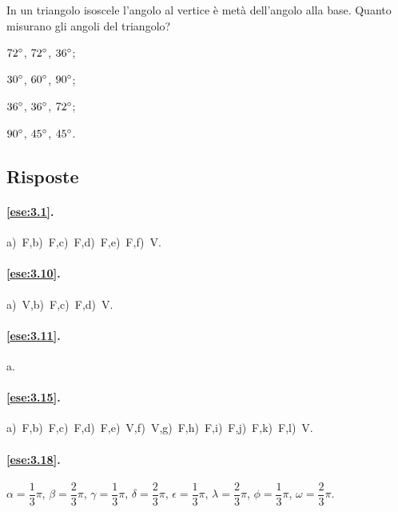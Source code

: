 \pagebreak

\begin{esercizio}
\label{ese:3.117}
In un triangolo isoscele l'angolo al vertice è metà dell'angolo alla base. Quanto misurano gli angoli del triangolo?
\begin{multicols}{4}
\begin{enumeratea}
\item $72{}^{\circ}$, $72{}^{\circ}$, $36{}^{\circ}$;
\item $30{}^{\circ}$, $60{}^{\circ}$, $90{}^{\circ}$;
\item $36{}^{\circ}$, $36{}^{\circ}$, $72{}^{\circ}$;
\item $90{}^{\circ}$, $45{}^{\circ}$, $45{}^{\circ}$.
\end{enumeratea}
\end{multicols}
\end{esercizio}


\subsection{Risposte}

\begingroup
\hypersetup{linkcolor=black}

\paragraph{\ref{ese:3.1}.}
a)~F,\quad b)~F,\quad c)~F,\quad d)~F,\quad e)~F,\quad f)~V.

\paragraph{\ref{ese:3.10}.}
a)~V,\quad b)~F,\quad c)~F,\quad d)~V.

\paragraph{\ref{ese:3.11}.}
a.

\paragraph{\ref{ese:3.15}.}
a)~F,\quad b)~F,\quad c)~F,\quad d)~F,\quad e)~V,\quad f)~V,\quad g)~F,\quad h)~F,\quad i)~F,\quad j)~F,\quad k)~F,\quad l)~V.

\paragraph{\ref{ese:3.18}.}
$\alpha=\dfrac{1}{3}\pi$, $\beta=\dfrac{2}{3}\pi$, $\gamma=\dfrac{1}{3}\pi$, $\delta=\dfrac{2}{3}\pi$, $\epsilon=\dfrac{1}{3}\pi$, $\lambda=\dfrac{2}{3}\pi$, $\phi=\dfrac{1}{3}\pi$, $\omega=\dfrac{2}{3}\pi$.

